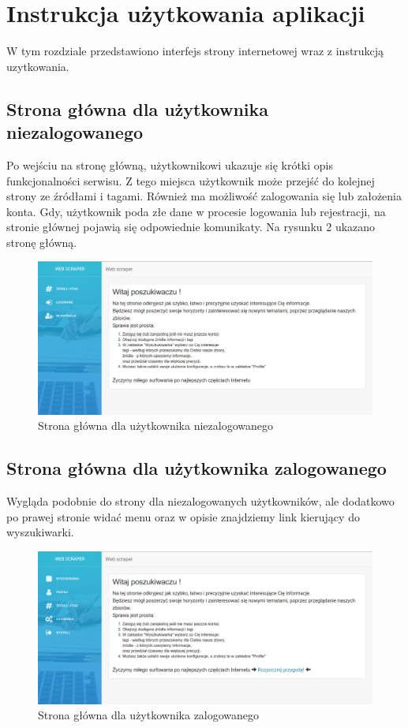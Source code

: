 \documentclass[12pt, titlepage]{article}
\begin{document}
	\newpage
	\section{Instrukcja użytkowania aplikacji}
	W tym rozdziale przedstawiono interfejs strony internetowej wraz z instrukcją uzytkowania.
	\subsection{Strona główna dla użytkownika niezalogowanego}
	Po wejściu na stronę główną, użytkownikowi ukazuje się krótki opis funkcjonalności serwisu. Z tego miejsca użytkownik może przejść do kolejnej strony ze źródłami i tagami. Również ma możliwość zalogowania się lub założenia konta. Gdy, użytkownik poda złe dane w procesie logowania lub rejestracji, na stronie głównej pojawią się odpowiednie komunikaty. Na rysunku 2 ukazano stronę główną.
	\begin{figure}[H]
		\centering
		\includegraphics[scale=0.40]{obrazki/stronaGlowna_niezalogowany.png}
		\caption{Strona główna dla użytkownika niezalogowanego}
		\label{fig:db_schema}
	\end{figure}
	
	\subsection{Strona główna dla użytkownika zalogowanego}
	Wygląda podobnie do strony dla niezalogowanych użytkowników, ale dodatkowo po prawej stronie widać menu oraz w opisie znajdziemy link kierujący do wyszukiwarki.
	\begin{figure}[H]
		\centering
		\includegraphics[scale=0.40]{obrazki/stronaGlowna_zalogowany.png}
		\caption{Strona główna dla użytkownika zalogowanego}
		\label{fig:db_schema}
	\end{figure}
\end{document}
